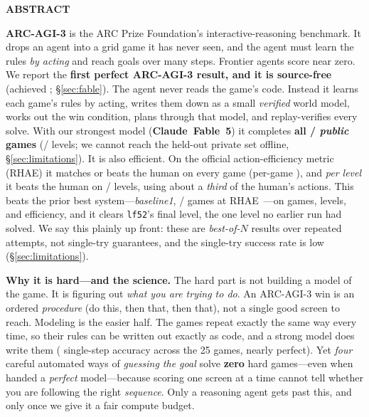 \documentclass[11pt]{article}
\newcommand{\NumArcGames}{25}
\begin{document}
\vspace{0.6em}
\begin{tcolorbox}[breakable, enhanced, colback=white, colframe=black!12,
  arc=3pt, boxrule=0.5pt, left=18pt, right=16pt, top=5pt, bottom=5pt,
  borderline west={3pt}{0pt}{cardblue}, drop fuzzy shadow=black!18]
\setlength{\parskip}{0pt}
{\sffamily\bfseries\color{cardblue} ABSTRACT}\par
\smallskip
\fontsize{9.2}{10.5}\selectfont
\textbf{ARC-AGI-3} is the ARC Prize Foundation's interactive-reasoning benchmark. It drops an agent into a
grid game it has never seen, and the agent must learn the rules \emph{by acting} and reach goals over many
steps. Frontier agents score near zero. We report the \textbf{first perfect ARC-AGI-3 result, and it is
source-free} (achieved \ArcMilestoneUTC{}; \S\ref{sec:fable}). The agent never reads the game's code.
Instead it learns each game's rules by acting, writes them down as a small \emph{verified} world model,
works out the win condition, plans through that model, and replay-verifies every solve. With our strongest
model (\textbf{Claude~Fable~5}) it completes \textbf{all \ArcFableFull/\ArcUnionGames{} \emph{public} games}
(\ArcFableLevels/\ArcTotalLevels{} levels; we cannot reach the held-out private set offline,
\S\ref{sec:limitations}). It is also efficient. On the official action-efficiency metric (RHAE) it matches
or beats the human on every game (per-game \ArcFableRhae{}), and \emph{per level} it beats the human on
\ArcRhaeLevelsOverHuman/\ArcRhaeNLevels{} levels, using about a \emph{third} of the human's actions. This
beats the prior best system---\emph{baseline1}, \ArcBaselineFull/\ArcUnionGames{} games at
\ArcRhaeBaselineOne{} RHAE~\cite{baseline1_ewm}---on games, levels, and efficiency, and it clears
\texttt{lf52}'s final level, the one level no earlier run had solved. We say this plainly up front: these
are \emph{best-of-$N$} results over repeated attempts, not single-try guarantees, and the single-try
success rate is low (\S\ref{sec:limitations}).

\textbf{Why it is hard---and the science.} The hard part is not building a model of the game. It is
figuring out \emph{what you are trying to do}. An ARC-AGI-3 win is an ordered \emph{procedure} (do this,
then that, then that), not a single good screen to reach. Modeling is the easier half. The games repeat
exactly the same way every time, so their rules can be written out exactly as code, and a strong model does
write them (\ArcClaudeFid{} single-step accuracy across the \NumArcGames{} games, \ArcNNearPerfect{} nearly
perfect). Yet \emph{four} careful automated ways of \emph{guessing the goal} solve \textbf{zero} hard
games---even when handed a \emph{perfect} model---because scoring one screen at a time cannot tell whether
you are following the right \emph{sequence}. Only a reasoning agent gets past this, and only once we give it
a fair compute budget.


\end{tcolorbox}
\end{document}
